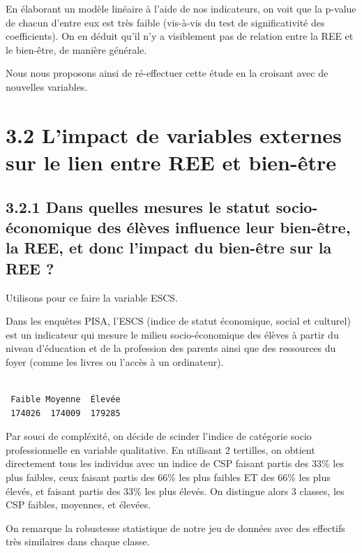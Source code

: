 \documentclass[
  french,
  11pt,
  a4paper,
  oneside]{report}
\begin{document}
En élaborant un modèle linéaire à l'aide de nos indicateurs, on voit que
la p-value de chacun d'entre eux est très faible (vis-à-vis du test de
significativité des coefficients). On en déduit qu'il n'y a visiblement
pas de relation entre la REE et le bien-être, de manière générale.

Nous nous proposons ainsi de ré-effectuer cette étude en la croisant
avec de nouvelles variables.

\section{3.2 L'impact de variables externes sur le lien entre REE et
bien-être}\label{limpact-de-variables-externes-sur-le-lien-entre-ree-et-bien-uxeatre}

\subsection{3.2.1 Dans quelles mesures le statut socio-économique des
élèves influence leur bien-être, la REE, et donc l'impact du bien-être
sur la REE
?}\label{dans-quelles-mesures-le-statut-socio-uxe9conomique-des-uxe9luxe8ves-influence-leur-bien-uxeatre-la-ree-et-donc-limpact-du-bien-uxeatre-sur-la-ree}

Utilisons pour ce faire la variable ESCS.

Dans les enquêtes PISA, l'ESCS (indice de statut économique, social et
culturel) est un indicateur qui mesure le milieu socio-économique des
élèves à partir du niveau d'éducation et de la profession des parents
ainsi que des ressources du foyer (comme les livres ou l'accès à un
ordinateur).

\begin{verbatim}

 Faible Moyenne  Élevée 
 174026  174009  179285 
\end{verbatim}

Par souci de compléxité, on décide de scinder l'indice de catégorie
socio professionnelle en variable qualitative. En utilisant 2 tertilles,
on obtient directement tous les individus avec un indice de CSP faisant
partis des 33\% les plus faibles, ceux faisant partis des 66\% les plus
faibles ET des 66\% les plus élevés, et faisant partis des 33\% les plus
élevés. On distingue alors 3 classes, les CSP faibles, moyennes, et
élevées.

On remarque la robustesse statistique de notre jeu de données avec des
effectifs très similaires dans chaque classe.
\end{document}
